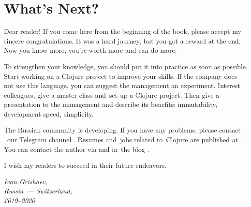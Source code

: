 \chapter{What’s Next?}

Dear reader! If you come here from the beginning of the book, please accept my sincere congratulations.
It was a hard journey, but you got a reward at the end.
Now you know more, you're worth more and can do more.

To strengthen your knowledge, you should put it into practice as soon as possible.
Start working on a Clojure project to improve your skills.
If the company does not use this language, you can suggest the management an experiment.
Interest colleagues, give a master class and~set up a Clojure project.
Then give a presentation to the management and describe its benefits: immutability, development speed, simplicity.

The Russian community is developing. If you have any problems, please contact
~our Telegram channel .
Resumes and~jobs related to~Clojure are published at .
You can contact the author via \EMAILLINK\xspace and in~the blog \SITELINK.

I wish my readers to succeed in their future endeavors.

\vspace{1em}

\noindent

\hspace{\fill}\parbox{4cm}{\textit{Ivan Grishaev,\\Russia~--- Switzerland,\\2019--2020}}
